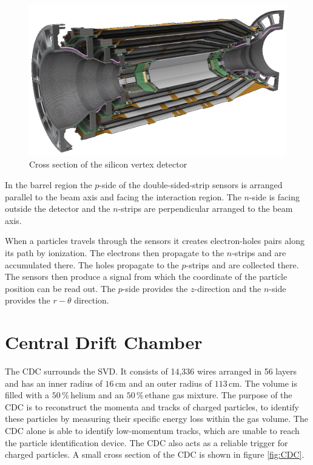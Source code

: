 \documentclass[a4paper,11pt,twosided,final,german,openbib,pdftex,listof=totoc,bibliography=totoc]{scrbook}
\begin{document}
\begin{figure}[h!]
	\centering
	\includegraphics[width=\textwidth]{Bilder/SVD.png}
	\caption[Silicon Vertex Detector]{Cross section of the silicon vertex detector\cite{SVDItalian}}
	\label{fig:SiliconVertex}
\end{figure}

In the barrel region the $p$-side of the double-sided-strip sensors is arranged parallel to the beam axis and facing the interaction region. The $n$-side is facing outside the detector and the $n$-strips are perpendicular arranged to the beam axis. 

When a particles travels through the sensors it creates electron-holes pairs along its path by ionization. The electrons then propagate to the $n$-strips and are accumulated there. The holes propagate to the $p$-strips and are collected there. The sensors then produce a signal from which the coordinate of the particle position can be read out. The $p$-side provides the $z$-direction and the $n$-side provides the $r-\theta$ direction.\cite{B2TR} \cite{bergauer2010silicon}



\section{Central Drift Chamber}
\label{sec:CDC}

The CDC surrounds the SVD. It consists of 14,336 wires arranged in 56 layers and has an inner radius of $16\,\textrm{cm}$ and an outer radius of $113\,\textrm{cm}$. The volume is filled with a $50\,\%\,\textrm{helium}$ and an $50\,\%\,\textrm{ethane}$ gas mixture. The purpose of the CDC is to reconstruct the momenta and tracks of charged particles, to identify these particles by measuring their specific energy loss within the gas volume. The CDC alone is able to identify low-momentum tracks, which are unable to reach the particle identification device. The CDC also acts as a reliable trigger for charged particles.\cite{B2TR} A small cross section of the CDC is shown in figure \ref{fig:CDC}.
\end{document}
